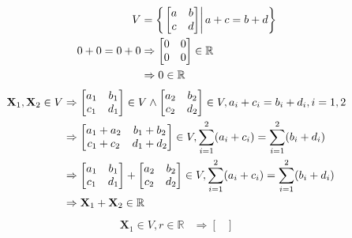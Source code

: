\documentclass[12pt, a4paper]{scrartcl}
\begin{document}
\begin{enumerate}
\begin{enumerate}
            \begin{align}
                V &= \left\{ \left. \begin{bmatrix}
                    a & b\\
                    c & d
                \end{bmatrix} \right| a+c=b+d \right\} \notag\\
                0+0=0+0 &\Rightarrow \begin{bmatrix}
                    0&0\\0&0
                \end{bmatrix} \in \mathbb{R} \notag\\ &\Rightarrow  0\in \mathbb{R}  
            \end{align}
            \begin{align}
                \textbf{X}_1, \textbf{X}_2 \in V &\Rightarrow \begin{bmatrix}
                    a_1&b_1\\c_1&d_1
                \end{bmatrix} \in V \land \begin{bmatrix}
                    a_2&b_2\\c_2&d_2
                \end{bmatrix} \in V, a_i+c_i=b_i+d_i, i=1, 2 \notag
                \\ &\Rightarrow \begin{bmatrix}
                    a_1+a_2&b_1+b_2\\c_1+c_2&d_1+d_2
                \end{bmatrix} \in V, \sum_{i=1}^{2} (a_i+c_i) = \sum_{i=1}^{2} (b_i+d_i) \notag
                \\ &\Rightarrow \begin{bmatrix}
                    a_1&b_1\\c_1&d_1
                \end{bmatrix} + \begin{bmatrix}
                    a_2&b_2\\c_2&d_2
                \end{bmatrix} \in V, \sum_{i=1}^{2} (a_i+c_i) = \sum_{i=1}^{2} (b_i+d_i) \notag
                \\ &\Rightarrow \textbf{X}_1 + \textbf{X}_2 \in \mathbb{R}
            \end{align}
            \begin{align}
                \textbf{X}_1 \in V, r \in \mathbb{R} &\Rightarrow \begin{bmatrix}

\end{bmatrix}
\end{align}
\end{enumerate}
\end{enumerate}
\end{document}
